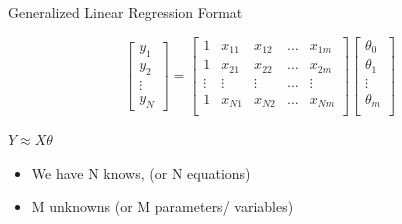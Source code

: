 \documentclass{beamer}
\begin{document}
\begin{frame}{Generalized Linear Regression Format}


    \[\begin{bmatrix}
        y_{1}\\
        y_{2} \\
        \vdots \\
        y_{N}
    \end{bmatrix}
    =     \begin{bmatrix}
        1 & x_{11} & x_{12} & \dots & x_{1m}\\
        1 & x_{21} & x_{22} & \dots & x_{2m}\\
        \vdots & \vdots & \vdots & \dots & \vdots\\
        1 & x_{N1} & x_{N2} & \dots & x_{Nm}\\
    \end{bmatrix}
    \begin{bmatrix}
        \theta_{0}\\
        \theta_{1}\\
        \vdots \\
        \theta_{m}\\
    \end{bmatrix}
   \]
   
   
   \begin{tcolorbox}
   \begin{center}
       
   

   $ Y \approx X\theta$
   \end{center}
   \end{tcolorbox}
   
   \begin{itemize}
       \item<+-> We have N knows, (or N equations)
       \item<+-> M unknowns (or M parameters/ variables)
   \end{itemize}
   
\end{frame}
\end{document}
